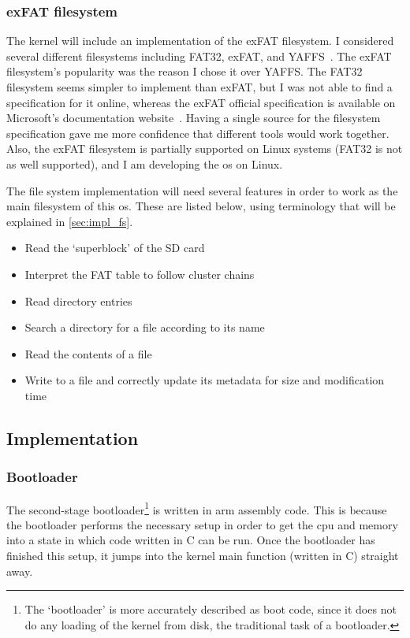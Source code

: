 \documentclass{article}
\begin{document}
\subsubsection{exFAT filesystem}
The kernel will include an implementation of the exFAT filesystem. I considered
several different filesystems including FAT32, exFAT, and
YAFFS~\cite{yaffs-fs}. The exFAT filesystem's popularity was the reason I chose
it over YAFFS. The FAT32 filesystem seems simpler to implement than exFAT, but
I was not able to find a specification for it online, whereas the exFAT
official specification is available on Microsoft's documentation
website~\cite{exFAT-specs}. Having a single source for the filesystem
specification gave me more confidence that different tools would work together.
Also, the exFAT filesystem is partially supported on Linux systems (FAT32 is
not as well supported), and I am developing the \gls{os} on Linux.

The file system implementation will need several features in order to work as
the main filesystem of this \gls{os}. These are listed below, using terminology
that will be explained in \autoref{sec:impl_fs}.

\begin{itemize}
    \item Read the `superblock' of the SD card
    \item Interpret the FAT table to follow cluster chains
    \item Read directory entries
    \item Search a directory for a file according to its name
    \item Read the contents of a file
    \item Write to a file and correctly update its metadata for size and
        modification time
\end{itemize}

\subsection{Implementation}
\subsubsection{Bootloader}
The second-stage bootloader\footnote{The `bootloader' is more accurately
described as boot code, since it does not do any loading of the kernel from
disk, the traditional task of a bootloader.} is written in \gls{arm} assembly
code. This is because the bootloader performs the necessary setup in order to
get the \gls{cpu} and memory into a state in which code written in C can be
run. Once the bootloader has finished this setup, it jumps into the kernel main
function (written in C) straight away.
\end{document}

